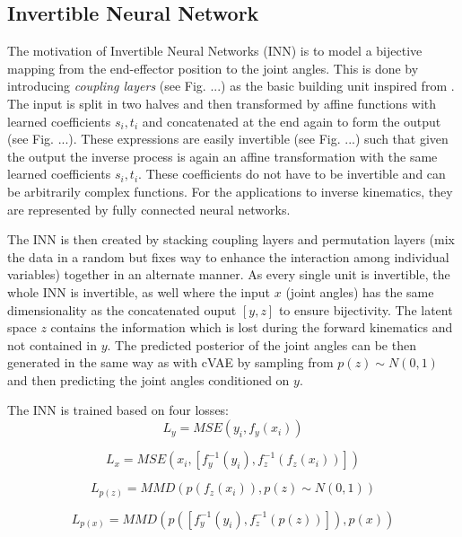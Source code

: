 \documentclass[conference]{IEEEtran}
\begin{document}
\subsection*{Invertible Neural Network}

The motivation of Invertible Neural Networks (INN) \cite{Ardizzone2018} is to model a bijective mapping from the end-effector position to the joint angles. This is done by introducing \textit{coupling layers} (see Fig. ...) as the basic building unit inspired from \cite{Dinh2016}. 
The input is split in two halves and then transformed by affine functions with learned coefficients $s_i, t_i$ and concatenated at the end again to form the output (see Fig. ...). These expressions are easily invertible (see Fig. ...) such that given the output the inverse process is again an affine transformation with the same learned coefficients $s_i, t_i$. These coefficients do not have to be invertible and can be arbitrarily complex functions. For the applications to inverse kinematics, they are represented by fully connected neural networks. 

The INN is then created by stacking coupling layers and permutation layers (mix the data in a random but fixes way to enhance the interaction among individual variables) together in an alternate manner. As every single unit is invertible, the whole INN is invertible, as well where the input $x$ (joint angles) has the same dimensionality as the concatenated ouput $[y, z]$ to ensure bijectivity. The latent space $z$ contains the information which is lost during the forward kinematics and not contained in $y$. The predicted posterior of the joint angles can be then generated in the same way as with cVAE by sampling from $p(z) \sim N(0, 1)$ and then predicting the joint angles conditioned on $y$.

The INN is trained based on four losses:
\begin{equation}
L_y = MSE(y_i, f_y(x_i))
\label{L_y}
\end{equation}

\begin{equation}
L_x = MSE(x_i, [f_y^{-1}(y_i),f_z^{-1}(f_z(x_i))])
\label{L_xy}
\end{equation}

\begin{equation}
L_{p(z)} = MMD(p(f_z(x_i)), p(z)\sim N(0, 1))
\label{L_z}
\end{equation}

\begin{equation}
L_{p(x)} = MMD(p([f_y^{-1}(y_i), f_z^{-1}(p(z))]), p(x))
\label{L_x}
\end{equation}
\end{document}
